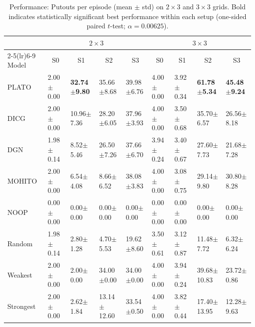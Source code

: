\begin{table}[!t]
\centering
\small
\setlength{\tabcolsep}{1.4pt}
\renewcommand{\arraystretch}{1.02}
\begin{tabular}{@{\hspace{2pt}}l|l|l|l|l||l|l|l|l@{\hspace{2pt}}}
\toprule
& \multicolumn{4}{c||}{$2\times 3$} & \multicolumn{4}{c}{$3\times 3$} \\
\cmidrule(lr){2-5}\cmidrule(lr){6-9}
Model & \multicolumn{1}{c|}{S0} & \multicolumn{1}{c|}{S1} & \multicolumn{1}{c|}{S2} & \multicolumn{1}{c||}{S3}
      & \multicolumn{1}{c|}{S0} & \multicolumn{1}{c|}{S1} & \multicolumn{1}{c|}{S2} & \multicolumn{1}{c}{S3} \\
\midrule

PLATO & 2.00$\pm$0.00 & \textbf{32.74$\pm$9.80} & 35.66$\pm$8.68 & 39.98$\pm$6.76
    & 4.00$\pm$0.00 & 3.92$\pm$0.34 & \textbf{61.78$\pm$5.34} & \textbf{45.48$\pm$9.24} \\
DICG  & 2.00$\pm$0.00 & 10.96$\pm$7.36 & 28.20$\pm$6.05 & 37.96$\pm$3.93
    & 4.00$\pm$0.00 & 3.50$\pm$0.68 & 35.70$\pm$6.57 & 26.56$\pm$8.18 \\
DGN & 1.98$\pm$0.14 & 8.52$\pm$5.46 & 26.50$\pm$7.26 & 37.66$\pm$6.70
    & 3.94$\pm$0.24 & 3.40$\pm$0.67 & 27.60$\pm$7.73 & 21.68$\pm$7.28 \\
MOHITO  & 2.00$\pm$0.00 & 6.54$\pm$4.08 & 8.66$\pm$6.52 & 38.08$\pm$3.83
    & 4.00$\pm$0.00 & 3.08$\pm$0.75 & 29.14$\pm$9.80 & 30.80$\pm$8.28 \\
NOOP  & 0.00$\pm$0.00 & 0.00$\pm$0.00 & 0.00$\pm$0.00 & 0.00$\pm$0.00
    & 0.00$\pm$0.00 & 0.00$\pm$0.00 & 0.00$\pm$0.00 & 0.00$\pm$0.00 \\
Random & 1.98$\pm$0.14 & 2.80$\pm$1.28 & 4.70$\pm$5.53 & 19.62$\pm$8.60
    & 3.50$\pm$0.61 & 3.12$\pm$0.87 & 11.48$\pm$7.72 & 6.32$\pm$6.24 \\
Weakest & 2.00$\pm$0.00 & 2.00$\pm$0.00 & 34.00$\pm$0.00 & 34.00$\pm$0.00
    & 4.00$\pm$0.00 & 3.94$\pm$0.24 & 39.68$\pm$10.83 & 23.72$\pm$0.86 \\
Strongest & 2.00$\pm$0.00 & 2.62$\pm$1.84 & 13.14$\pm$12.60 & 33.54$\pm$0.50
        & 4.00$\pm$0.00 & 3.82$\pm$0.44 & 17.40$\pm$13.95 & 12.28$\pm$9.63 \\

\bottomrule
\end{tabular}
\caption{Performance: Putouts per episode (mean $\pm$ std) on $2\times 3$ and $3\times 3$ grids. Bold indicates statistically significant best performance within each setup (one-sided paired $t$-test; $\alpha=0.00625$).}
\label{tab:putout_2x3_3x3}
\end{table}


